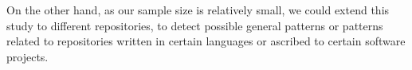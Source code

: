 \documentclass[conference]{IEEEtran}
\begin{document}
On the other hand, as our sample size is relatively small, we could extend this study to different repositories, to detect possible general patterns or patterns related to repositories written in certain languages or ascribed to certain software projects.



\end{document}
